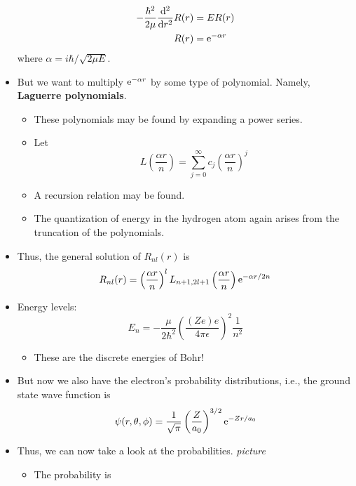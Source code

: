 \documentclass[../notes.tex]{subfiles}
\begin{document}
\begin{itemize}
\begin{align*}
        -\frac{\hbar^2}{2\mu}\dv[2]{r}R(r) &= ER(r)\\
        R(r) &= \e[-\alpha r]
    \end{align*}
    where $\alpha=i\hbar/\sqrt{2\mu E}$.
    \item But we want to multiply $\e[-\alpha r]$ by some type of polynomial. Namely, \textbf{Laguerre polynomials}.
    \begin{itemize}
        \item These polynomials may be found by expanding a power series.
        \item Let
        \begin{equation*}
            L\left( \frac{\alpha r}{n} \right) = \sum_{j=0}^\infty c_j\left( \frac{\alpha r}{n} \right)^j
        \end{equation*}
        \item A recursion relation may be found.
        \item The quantization of energy in the hydrogen atom again arises from the truncation of the polynomials.
    \end{itemize}
    \item Thus, the general solution of $R_{nl}(r)$ is
    \begin{equation*}
        R_{nl}(r) = \left( \frac{\alpha r}{n} \right)^lL_{n+1,2l+1}\left( \frac{\alpha r}{n} \right)\e[-\alpha r/2n]
    \end{equation*}
    \item Energy levels:
    \begin{equation*}
        E_n = -\frac{\mu}{2\hbar^2}\left( \frac{(Ze)e}{4\pi\epsilon} \right)^2\frac{1}{n^2}
    \end{equation*}
    \begin{itemize}
        \item These are the discrete energies of Bohr!
    \end{itemize}
    \item But now we also have the electron's probability distributions, i.e., the ground state wave function is
    \begin{equation*}
        \psi(r,\theta,\phi) = \frac{1}{\sqrt{\pi}}\left( \frac{Z}{a_0} \right)^{3/2}\e[-Zr/a_0]
    \end{equation*}
    \item Thus, we can now take a look at the probabilities.
    \emph{picture}
    \begin{itemize}
        \item The probability is
        \begin{equation*}

\end{equation*}
\end{itemize}
\end{itemize}
\end{document}
